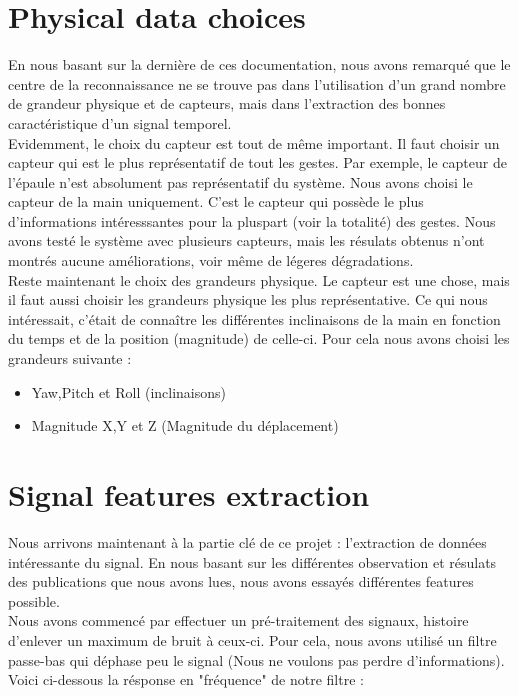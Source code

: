\section{Physical data choices}
En nous basant sur la dernière de ces documentation, nous avons remarqué que le centre de la reconnaissance ne se trouve pas dans l'utilisation d'un grand nombre de grandeur physique et de capteurs, mais dans l'extraction des bonnes caractéristique d'un signal temporel.\\

Evidemment, le choix du capteur est tout de même important. Il faut choisir un capteur qui est le plus représentatif de tout les gestes. Par exemple, le capteur de l'épaule n'est absolument pas représentatif du système.
Nous avons choisi le capteur de la main uniquement. C'est le capteur qui possède le plus d'informations intéresssantes pour la pluspart (voir la totalité) des gestes. Nous avons testé le système avec plusieurs capteurs, mais les résulats obtenus n'ont montrés aucune améliorations, voir même de légeres dégradations.\\

Reste maintenant le choix des grandeurs physique. Le capteur est une chose, mais il faut aussi choisir les grandeurs physique les plus représentative. Ce qui nous intéressait, c'était de connaître les différentes inclinaisons de la main en fonction du temps et de la position (magnitude) de celle-ci. Pour cela nous avons choisi les grandeurs suivante :
\begin{itemize}
\item Yaw,Pitch et Roll (inclinaisons)
\item Magnitude X,Y et Z (Magnitude du déplacement)

\end{itemize}

\pagebreak
\section{Signal features extraction}
Nous arrivons maintenant à la partie clé de ce projet : l'extraction de données intéressante du signal. En nous basant sur les différentes observation et résulats des publications que nous avons lues, nous avons essayés différentes features possible.\\

Nous avons commencé par effectuer un pré-traitement des signaux, histoire d'enlever un maximum de bruit à ceux-ci. Pour cela, nous avons utilisé un filtre passe-bas qui déphase peu le signal (Nous ne voulons pas perdre d'informations). Voici ci-dessous la résponse en "fréquence" de notre filtre :

